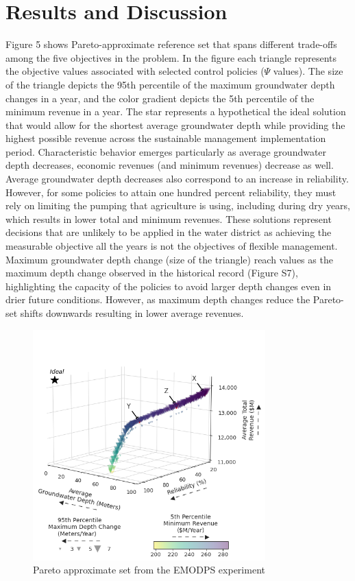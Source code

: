 \documentclass[11pt,a4paper]{article}
\begin{document}
\section{Results and Discussion}

Figure 5 shows  Pareto-approximate reference set that spans different trade-offs among the five objectives in the problem. In the figure each triangle represents the objective values associated with selected control policies ($\Psi$ values). The size of the triangle depicts the 95th percentile of the maximum groundwater depth changes in a year, and the color gradient depicts the 5th percentile of the minimum revenue in a year. The star represents a hypothetical the ideal solution that would allow for the shortest average groundwater depth while providing the highest possible revenue across the sustainable management implementation period. Characteristic behavior emerges particularly as average groundwater depth decreases, economic revenues (and minimum revenues) decrease as well. Average groundwater depth decreases also correspond to an increase in reliability. However, for some policies to attain one hundred percent reliability, they must rely on limiting the pumping that agriculture is using, including during dry years, which results in lower total and minimum revenues. These solutions represent decisions that are unlikely to be applied in the water district as achieving the measurable objective all the years is not the objectives of flexible management. Maximum groundwater depth change (size of the triangle) reach values as the maximum depth change observed in the historical record (Figure S7), highlighting the capacity of the policies to avoid larger depth changes even in drier future conditions. However, as maximum depth changes reduce the Pareto-set shifts downwards resulting in lower average revenues. 

\begin{figure}[H]
    \centering
    \includegraphics[width=0.8\textwidth]{selected_policies_3d.png}
    \caption{Pareto approximate set from the EMODPS experiment} \label{fig:parallel_robustness}
\end{figure}
\end{document}

